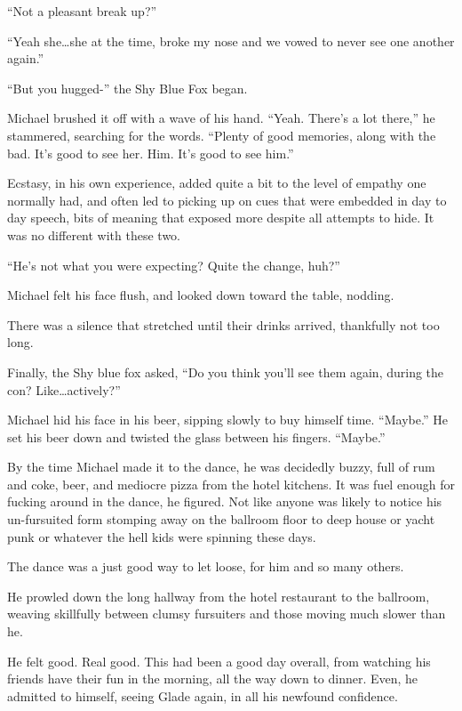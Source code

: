 ``Not a pleasant break up?''

``Yeah she\ldots{}she at the time, broke my nose and we vowed to never see one another again.''

``But you hugged-'' the Shy Blue Fox began.

Michael brushed it off with a wave of his hand.  ``Yeah.  There's a lot there,'' he stammered, searching for the words.  ``Plenty of good memories, along with the bad.  It's good to see her.  Him.  It's good to see him.''

Ecstasy, in his own experience, added quite a bit to the level of empathy one normally had, and often led to picking up on cues that were embedded in day to day speech, bits of meaning that exposed more despite all attempts to hide.  It was no different with these two.

``He's not what you were expecting?  Quite the change, huh?''

Michael felt his face flush, and looked down toward the table, nodding.

There was a silence that stretched until their drinks arrived, thankfully not too long.

Finally, the Shy blue fox asked, ``Do you think you'll see them again, during the con?  Like\ldots{}actively?''

Michael hid his face in his beer, sipping slowly to buy himself time.  ``Maybe.''  He set his beer down and twisted the glass between his fingers.  ``Maybe.''

\secdiv

By the time Michael made it to the dance, he was decidedly buzzy, full of rum and coke, beer, and mediocre pizza from the hotel kitchens.  It was fuel enough for fucking around in the dance, he figured.  Not like anyone was likely to notice his un-fursuited form stomping away on the ballroom floor to deep house or yacht punk or whatever the hell kids were spinning these days.

The dance was a just good way to let loose, for him and so many others.

He prowled down the long hallway from the hotel restaurant to the ballroom, weaving skillfully between clumsy fursuiters and those moving much slower than he.

He felt good.  Real good.  This had been a good day overall, from watching his friends have their fun in the morning, all the way down to dinner.  Even, he admitted to himself, seeing Glade again, in all his newfound confidence.

